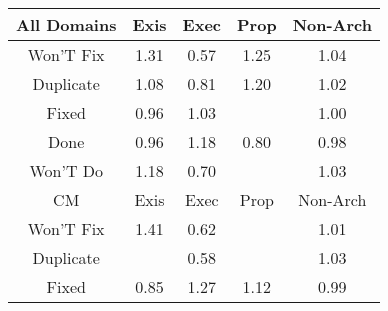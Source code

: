 \begin{tabular}{|c||c|c|c|c|}
\hline
All Domains & Exis & Exec & Prop & Non-Arch \\ 
\hline
Won'T Fix & \cellcolor[rgb]{0.8436796177692374,0.8085850821012177,0.42} 1.31 & \cellcolor[rgb]{0.8031133554434318,0.3340698824322435,0.320239131747203} 0.57 & \cellcolor[rgb]{0.8564547189128713,0.8146364458008337,0.42} 1.25 & \cellcolor[rgb]{0.902477423861518,0.836436674460719,0.42} 1.04 \\ 
\hline
Duplicate & \cellcolor[rgb]{0.8934778245680685,0.8321737063743482,0.42} 1.08 & \cellcolor[rgb]{0.8612005971854141,0.6090161600109596,0.3744538907063864} 0.81 & \cellcolor[rgb]{0.8673807444050275,0.8198119315602761,0.42} 1.20 & \cellcolor[rgb]{0.906015318521896,0.8381125192998454,0.42} 1.02 \\ 
\hline
Fixed & \cellcolor[rgb]{0.8987448864565398,0.7867257958942883,0.4094952273594371} 0.96 & \cellcolor[rgb]{0.9026152447601795,0.8365019580442955,0.42} 1.03 &  & \cellcolor[rgb]{0.9094571245005488,0.8374303893025973,0.4194933162005121} 1.00 \\ 
\hline
Done & \cellcolor[rgb]{0.9009705180281986,0.7972604520001398,0.4115724834929853} 0.96 & \cellcolor[rgb]{0.8727488861223804,0.8223547355316538,0.42} 1.18 & \cellcolor[rgb]{0.859921753311958,0.6029629656766009,0.3732603030911607} 0.80 & \cellcolor[rgb]{0.905248856323294,0.8175112532635915,0.4155655992350744} 0.98 \\ 
\hline
Won'T Do & \cellcolor[rgb]{0.871459101383458,0.8217437848658484,0.42} 1.18 & \cellcolor[rgb]{0.8357918106911917,0.4887479039383073,0.3507390233117789} 0.70 &  & \cellcolor[rgb]{0.9033318352368986,0.8368413956385309,0.42} 1.03 \\ 
\hline
\hline
CM & Exis & Exec & Prop & Non-Arch \\ 
\hline
Won'T Fix & \cellcolor[rgb]{0.8224991759180709,0.7985522412243494,0.42} 1.41 & \cellcolor[rgb]{0.8145405218826469,0.3881584702445287,0.3309044870904705} 0.62 &  & \cellcolor[rgb]{0.9085931764545256,0.8393336098995121,0.42} 1.01 \\ 
\hline
Duplicate &  & \cellcolor[rgb]{0.8047743328851921,0.34193184232324236,0.32178937735951263} 0.58 &  & \cellcolor[rgb]{0.9043679483513427,0.8373321860611623,0.42} 1.03 \\ 
\hline
Fixed & \cellcolor[rgb]{0.8728316457158138,0.664069789721519,0.38530953600142626} 0.85 & \cellcolor[rgb]{0.8524870555088023,0.8127570262936432,0.42} 1.27 & \cellcolor[rgb]{0.8854034134895131,0.8283489853371379,0.42} 1.12 & \cellcolor[rgb]{0.9066763112122095,0.8242678730711247,0.4168978904647288} 0.99 \\ 

\end{tabular}
